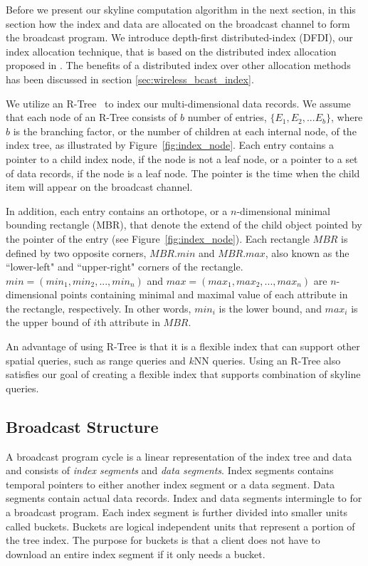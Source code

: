 
Before we present our skyline computation algorithm in the next
section, in this section how the index and data are allocated on
the broadcast channel to form the broadcast program. We introduce
depth-first distributed-index (DFDI), our index allocation
technique, that is based on the distributed index allocation
proposed in \cite{data_on_air}. The benefits of a distributed
index over other allocation methods has been discussed in section
\ref{sec:wireless_bcast_index}.

We utilize an R-Tree~\cite{DBLP:conf/sigmod/Guttman84} to index our
multi-dimensional data records. We assume that each node of an R-Tree
consists of $b$ number of entries, $\{E_1, E_2, ... E_b\}$, where
$b$ is the branching factor, or the number of children at each internal
node, of the index tree, as illustrated by Figure~\ref{fig:index_node}.
Each entry contains a pointer to a child index node, if the node is not
a leaf node, or a pointer to a set of data records, if the node is a leaf
node. The pointer is the time when the child item will appear on the
broadcast channel.

In addition, each entry contains an orthotope, or a $n$-dimensional minimal
bounding rectangle (MBR), that denote the extend of the child object pointed
by the pointer of the entry (see Figure~\ref{fig:index_node}). Each
rectangle $MBR$ is defined by two opposite corners, $MBR.min$ and $MBR.max$,
also known as the ``lower-left" and ``upper-right" corners of the rectangle.
$min = (min_1, min_2, ..., min_n)$ and $max = (max_1, max_2, ..., max_n)$
are $n$-dimensional points containing minimal and maximal value of each
attribute in the rectangle, respectively. In other words, $min_i$ is the
lower bound, and $max_i$ is the upper bound of $i$th attribute in $MBR$.

An advantage of using R-Tree is that
it is a flexible index that can support other spatial queries,
such as range queries and $k$NN queries.
Using an R-Tree also satisfies our goal of creating a flexible index that
supports combination of skyline queries.

\subsection{Broadcast Structure}

A broadcast program cycle is a linear representation of the index
tree and data and consists of \emph{index segments} and
\emph{data segments}. Index segments contains temporal pointers to
either another index segment or a data segment. Data segments
contain actual data records. Index and data segments intermingle
to for a broadcast program. Each index segment is further divided
into smaller units called buckets. Buckets are logical independent
units that represent a portion of the tree index. The purpose for
buckets is that a client does not have to download an entire index
segment if it only needs a bucket.

